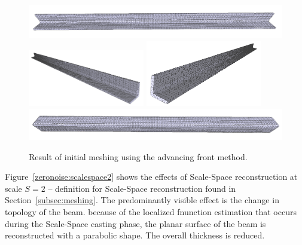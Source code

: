 \documentclass[12pt]{drexelthesis}
\begin{document}
\begin{figure}[!ht]
	
	\centering
		\includegraphics[width=5in]{simulated-lab-scan/0noise/cleanNeat/advancingfront00.png}
		\includegraphics[width=2in]{simulated-lab-scan/0noise/cleanNeat/advancingfront01.png}
		\includegraphics[width=2in]{simulated-lab-scan/0noise/cleanNeat/advancingfront02.png}
		\includegraphics[width=5in]{simulated-lab-scan/0noise/cleanNeat/advancingfront03.png}
		\caption[Initial meshing using a raw advancing front approach]{\centering  Result of initial meshing using the advancing front method.}
		\label{zeronoise:advancingfront}
\end{figure}

Figure~\ref{zeronoise:scalespace2} shows the effects of Scale-Space reconstruction at scale $S = 2$ -- definition for Scale-Space reconstruction found in Section~\ref{subsec:meshing}. The predominantly visible effect is the change in topology of the beam. because of the localized fnunction estimation that occurs during the Scale-Space casting phase, the planar surface of the beam is reconstructed with a parabolic shape. The overall thickness is reduced.
\end{document}
